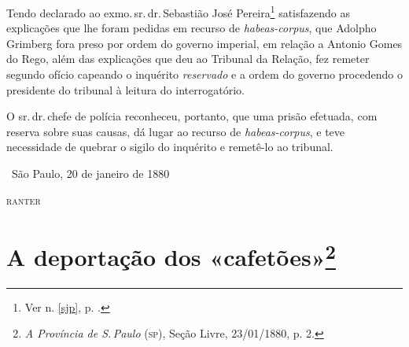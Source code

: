 Tendo declarado ao exmo.\,sr.\,dr.\,Sebastião José Pereira\footnote{Ver n. \ref{sjp}, p. \pageref{sjp}.}
satisfazendo as explicações
que lhe foram pedidas em recurso de \emph{habeas-corpus}, que Adolpho
Grimberg fora preso por ordem do governo imperial, em relação a Antonio
Gomes do Rego, além das explicações que deu ao Tribunal da Relação, fez
remeter segundo ofício capeando o inquérito \emph{reservado} e a ordem
do governo procedendo o presidente do tribunal à leitura do
interrogatório.

O sr.\,dr.\,chefe de polícia reconheceu, portanto, que uma prisão
efetuada, com reserva sobre suas causas, dá lugar ao recurso de
\emph{habeas-corpus}, e teve necessidade de quebrar o sigilo do
inquérito e remetê-lo ao tribunal.\medskip

\hfill\ São Paulo, 20 de janeiro de 1880

\hfill\textsc{ranter}

\chapter{A deportação dos «cafetões»\footnote{\emph{A Província
  de S.\,Paulo} (\textsc{sp}), Seção Livre, 23/01/1880, p. 2.}}

